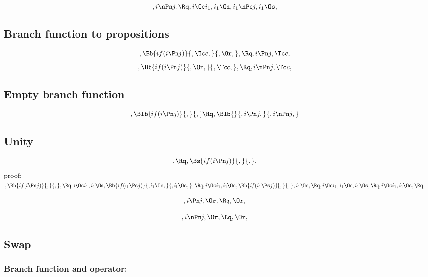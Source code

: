 \[,i \nPn j, \Rq , i \Oc i_1, i_1 \On, i_1 \nPs j, i_1 \Os,  \]

\bigskip
\bigskip
\subsection{Branch function to propositions}
\[,\Bb{if(i \Pn j)}{,\Tc c,}{,\Or,}, \Rq ,i \Pn j, \Tc c,\]
\bigskip
\bigskip
\[,\Bb{if(i \Pn j)}{,\Or,}{,\Tc c,}, \Rq ,i \nPn j, \Tc c,\]
\bigskip
\bigskip


\subsection{Empty branch function} 
\[, \Blb{if(i \Pn j)}{,}{,} \Rq , \Blb{}{, i \Pn j,}{, i \nPn j,}\]

\bigskip
\bigskip

\subsection{ Unity}
\[, \Rq , \Bs{if(i \Pn j)}{,}{,},\]
\bigskip
\bigskip
proof:\\
\begin{math} 
,\Bb{if(i \Pn j)}{,}{,},\\\\
\Rq, i \Oc i_1, i_1 \On, \Bb{if(i_1 \Ps j)}{, i_1 \Os,}{, i_1 \Os,},\\\\\\
\Rq, i \Oc i_1, i_1 \On, \Bb{if(i_1 \Ps j)}{,}{,}, i_1 \Os,\\\\\\
\Rq, i \Oc i_1, i_1 \On,  i_1 \Os,\\\\\\
\Rq, i \Oc i_1,  i_1 \Os,\\\\\\
\Rq, 
\end{math}
\bigskip
\bigskip


\[, i \Pn j, \Or, \Rq , \Or,\]

\[, i \nPn j, \Or, \Rq , \Or,\]



\bigskip
\bigskip
\bigskip
\bigskip
\subsection{ Swap}
\subsubsection{Branch function and operator:}

